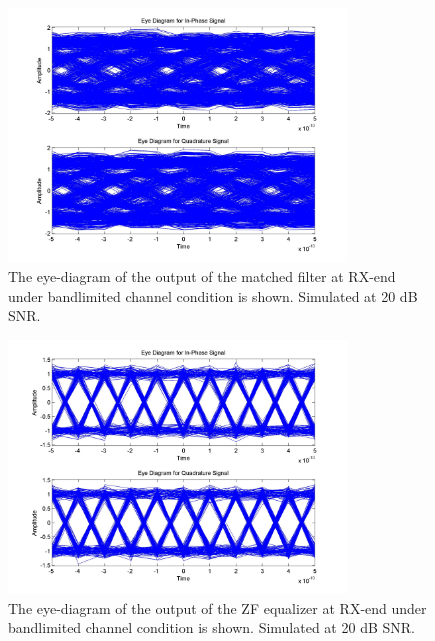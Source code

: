 \documentclass[]{article}
\begin{document}
\begin{figure}[H]
\centering
\includegraphics[width=0.8\textwidth]{matched_eye_qpsk20.jpg}
\caption{The eye-diagram of the output of the matched filter at RX-end under bandlimited channel condition is shown. Simulated at 20 dB SNR. \label{fig:qpEyeMatch}}
\end{figure}

\begin{figure}[H]
\centering
\includegraphics[width=0.8\textwidth]{equalized_eye_qpsk20.jpg}
\caption{ The eye-diagram of the output of the ZF equalizer at RX-end under bandlimited channel condition is shown. Simulated at 20 dB SNR.\label{fig:qpEyeEqu}}
\end{figure}
\end{document}
